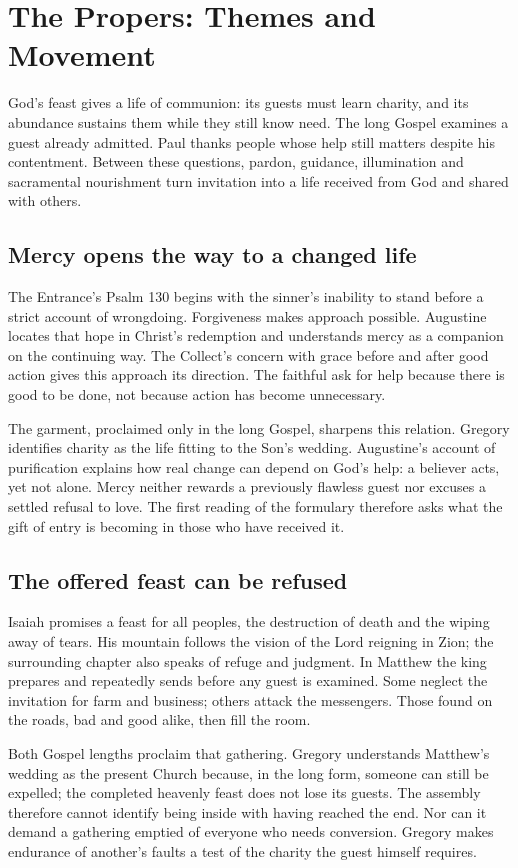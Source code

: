 \section{The Propers: Themes and Movement}
God's feast gives a life of communion: its guests must learn charity, and its abundance sustains them while they still know need. The long Gospel examines a guest already admitted. Paul thanks people whose help still matters despite his contentment. Between these questions, pardon, guidance, illumination and sacramental nourishment turn invitation into a life received from God and shared with others.

\subsection{Mercy opens the way to a changed life}
The Entrance's Psalm 130 begins with the sinner's inability to stand before a strict account of wrongdoing. Forgiveness makes approach possible. Augustine locates that hope in Christ's redemption and understands mercy as a companion on the continuing way. The Collect's concern with grace before and after good action gives this approach its direction. The faithful ask for help because there is good to be done, not because action has become unnecessary.

The garment, proclaimed only in the long Gospel, sharpens this relation. Gregory identifies charity as the life fitting to the Son's wedding. Augustine's account of purification explains how real change can depend on God's help: a believer acts, yet not alone. Mercy neither rewards a previously flawless guest nor excuses a settled refusal to love. The first reading of the formulary therefore asks what the gift of entry is becoming in those who have received it.

\subsection{The offered feast can be refused}
Isaiah promises a feast for all peoples, the destruction of death and the wiping away of tears. His mountain follows the vision of the Lord reigning in Zion; the surrounding chapter also speaks of refuge and judgment. In Matthew the king prepares and repeatedly sends before any guest is examined. Some neglect the invitation for farm and business; others attack the messengers. Those found on the roads, bad and good alike, then fill the room.

Both Gospel lengths proclaim that gathering. Gregory understands Matthew's wedding as the present Church because, in the long form, someone can still be expelled; the completed heavenly feast does not lose its guests. The assembly therefore cannot identify being inside with having reached the end. Nor can it demand a gathering emptied of everyone who needs conversion. Gregory makes endurance of another's faults a test of the charity the guest himself requires.

